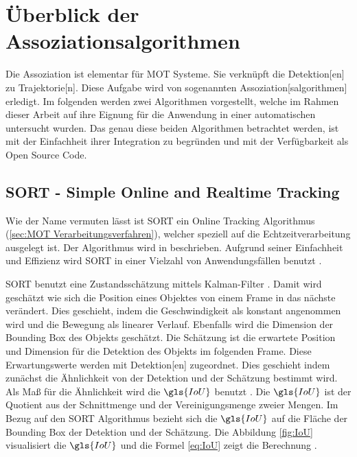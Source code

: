 \section{Überblick der Assoziationsalgorithmen}

Die \gls{Assoziation} ist elementar für \gls{MOT} Systeme. Sie verknüpft die \gls{Detektion}[en] zu \gls{Trajektorie}[n]. Diese Aufgabe wird von sogenannten \gls{Assoziation}[salgorithmen] erledigt. Im folgenden werden zwei Algorithmen vorgestellt, welche im Rahmen dieser Arbeit auf ihre Eignung für die Anwendung in einer automatischen  untersucht wurden. Das genau diese beiden Algorithmen betrachtet werden, ist mit der Einfachheit ihrer Integration zu begründen und mit der Verfügbarkeit als Open Source Code. 


\subsection{SORT - Simple Online and Realtime Tracking} \label{sec:MOT SORT}

Wie der Name vermuten lässt ist \acrshort{SORT} ein \gls{Online Tracking} Algorithmus (\ref{sec:MOT Verarbeitungsverfahren}), welcher speziell auf die Echtzeitverarbeitung ausgelegt ist. Der Algorithmus wird in \cite{Bewley.2016} beschrieben. Aufgrund seiner Einfachheit und Effizienz wird \acrshort{SORT} in einer Vielzahl von Anwendungsfällen benutzt \cite{Chen.2023, Maher.2018, Fedorov.2019}. \par

\acrshort{SORT} benutzt eine Zustandsschätzung mittels Kalman-Filter \cite{Kalman.1960}. Damit wird geschätzt wie sich die Position eines Objektes von einem \gls{Frame} in das nächste verändert. Dies geschieht, indem die Geschwindigkeit als konstant angenommen wird und die Bewegung als linearer Verlauf. Ebenfalls wird die Dimension der \gls{Bounding Box} des Objekts geschätzt. Die Schätzung ist die erwartete Position und Dimension für die \gls{Detektion} des Objekts im folgenden \gls{Frame}. Diese Erwartungswerte werden mit \gls{Detektion}[en] zugeordnet. Dies geschieht indem zunächst die Ähnlichkeit von der \gls{Detektion} und der Schätzung bestimmt wird. Als Maß für die Ähnlichkeit wird die \(\gls{IoU}\) benutzt  \cite{Bewley.2016}. Die \(\gls{IoU}\) ist der Quotient aus der Schnittmenge und der Vereinigungsmenge zweier Mengen. Im Bezug auf den \acrshort{SORT} Algorithmus bezieht sich die \(\gls{IoU}\) auf die Fläche der \gls{Bounding Box} der \gls{Detektion} und der Schätzung. Die Abbildung \ref{fig:IoU} visualisiert die \(\gls{IoU}\) und die Formel \ref{eq:IoU} zeigt die Berechnung \cite{Rezatofighi.2019}. 

